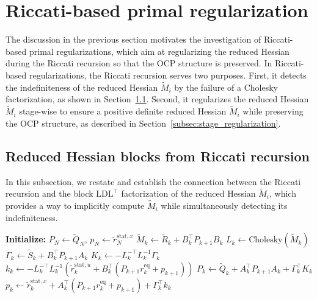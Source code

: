 \documentclass[class=scrbook, crop=false]{standalone}
\begin{document}
\section{Riccati-based primal regularization}
\label{sec:riccati_primal_reg}
The discussion in the previous section motivates the investigation of Riccati-based primal regularizations, 
which aim at regularizing the reduced Hessian during the Riccati recursion so that the \gls{OCP} structure is preserved.
In Riccati-based regularizations, the Riccati recursion serves two purposes.
First, it detects the indefiniteness of the reduced Hessian $\tilde{M}_i$ by the failure of a Cholesky factorization,
as shown in Section~\ref{subsec:block_reduced_hessian}.
Second, it regularizes the reduced Hessian $\tilde{M}_i$ stage-wise to ensure a positive definite reduced Hessian $\tilde{M}_i$ 
while preserving the \gls{OCP} structure, as described in Section~\ref{subsec:stage_regularization}.

\subsection{Reduced Hessian blocks from Riccati recursion}
\label{subsec:block_reduced_hessian}
In this subsection, we restate and establish the connection between
the Riccati recursion and the block $\mathrm{LD}\mathrm{L}^\top$ factorization of the reduced Hessian $\tilde{M}_i$,
which provides a way to implicitly compute $\tilde{M}_i$ while simultaneously detecting its indefiniteness.

\begin{algorithm}[htbp]
\caption{Backward pass of Riccati recursion}
\label{alg:riccati_recursion_backward}
\begin{algorithmic}[1]
\State\textbf{Initialize:} $P_N \gets \tilde{Q}_N$, $p_N \gets \tilde{r}_N^{\mathrm{stat}, x}$
\Statex 
{}
    \State $\tilde{M}_k \gets \tilde{R}_k + B_k^\top P_{k+1} B_k$
    \State $L_k \gets \mathrm{Cholesky}(\tilde{M}_k)$
    \State $\Gamma_k \gets \tilde{S}_k + B_k^\top P_{k+1} A_k$
    \Statex
    \State $K_k \gets -L_k^{-\top} L_k^{-1} \Gamma_k$
    \State $k_k \gets -L_k^{-\top} L_k^{-1} \left(\tilde{r}_k^{\mathrm{stat}, u} + B_k^\top (P_{k+1} r_k^{\mathrm{eq}} + p_{k+1})\right)$
    \Statex
    \State $P_k \gets \tilde{Q}_k + A_k^\top P_{k+1} A_k + \Gamma_k^\top K_k$
    \State $p_k \gets \tilde{r}_k^{\mathrm{stat}, x} + A_k^\top (P_{k+1} r_k^{\mathrm{eq}} + p_{k+1}) + \Gamma_k^\top k_k$
\EndFor
\end{algorithmic}
\end{algorithm}
\end{document}
